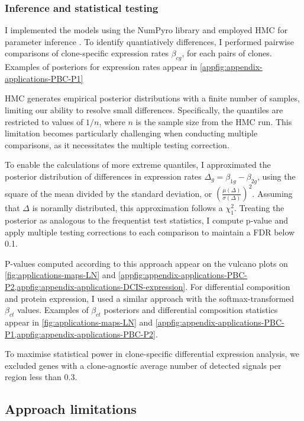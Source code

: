 \subsubsection*{Inference and statistical testing}

I implemented the models using the \ac{NumPyro} library and employed \acf{HMC} for parameter inference . To identify quantiatively differences, I performed pairwise comparisons of clone-specific expression rates $\beta_{cg}$, for each pairs of clones. Examples of posteriors for expression rates appear in \cref{appfig:appendix-applications-PBC-P1}

\ac{HMC} generates empirical posterior distributions with a finite number of samples, limiting our ability to resolve small differences. Specifically, the quantiles are restricted to values of $1/n$, where $n$ is the sample size from the \ac{HMC} run. This limitation becomes particularly challenging when conducting multiple comparisons, as it necessitates the multiple testing correction. 

To enable the calculations of more extreme quantiles, I approximated the posterior distribution of differences in expression rates $\Delta_g = \beta_{1g} - \beta_{2g}$, using the square of the mean divided by the standard deviation, or $\left(\frac{\mu(\Delta)}{\sigma(\Delta)}\right)^2$. Assuming that $\Delta$ is noramlly distributed, this approximation follows a $\chi_{1}^{2}$. Treating the posterior as analogous to the frequentist test statistics, I compute p-value and apply multiple testing corrections to each comparison to maintain a \acf{FDR} below 0.1.


P-values computed according to this approach appear on the vulcano plots on \cref{fig:applications-maps-LN} and \cref{appfig:appendix-applications-PBC-P2,appfig:appendix-applications-DCIS-expression}. For differential composition and protein expression, I used a similar approach with the softmax-transformed $\beta_{ct}$ values. Examples of $\beta_{ct}$ posteriors and differential composition statistics appear in \cref{fig:applications-maps-LN} and \cref{appfig:appendix-applications-PBC-P1,appfig:appendix-applications-PBC-P2}. 

To maximise statistical power in clone-specific differential expression analysis, we excluded genes with a clone-agnostic average number of detected signals per region less than 0.3.

\subsection{Approach limitations}


